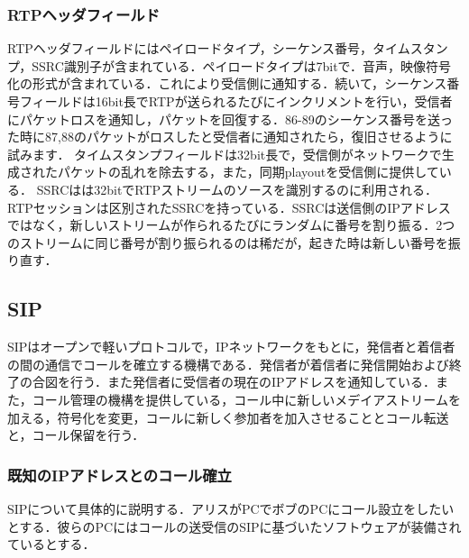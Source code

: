 \documentclass[9pt,a4j,twocolumn]{jsarticle}
\begin{document}
\subsubsection{RTPヘッダフィールド}
RTPヘッダフィールドにはペイロードタイプ，シーケンス番号，タイムスタンプ，SSRC識別子が含まれている．ペイロードタイプは7bitで．音声，映像符号化の形式が含まれている．これにより受信側に通知する．続いて，シーケンス番号フィールドは16bit長でRTPが送られるたびにインクリメントを行い，受信者にパケットロスを通知し，パケットを回復する．86-89のシーケンス番号を送った時に87,88のパケットがロスしたと受信者に通知されたら，復旧させるように試みます．
タイムスタンプフィールドは32bit長で，受信側がネットワークで生成されたパケットの乱れを除去する，また，同期playoutを受信側に提供している．
SSRCはは32bitでRTPストリームのソースを識別するのに利用される．RTPセッションは区別されたSSRCを持っている．SSRCは送信側のIPアドレスではなく，新しいストリームが作られるたびにランダムに番号を割り振る．2つのストリームに同じ番号が割り振られるのは稀だが，起きた時は新しい番号を振り直す．

\subsection{SIP}
SIPはオープンで軽いプロトコルで，IPネットワークをもとに，発信者と着信者の間の通信でコールを確立する機構である．発信者が着信者に発信開始および終了の合図を行う．また発信者に受信者の現在のIPアドレスを通知している．また，コール管理の機構を提供している，コール中に新しいメデイアストリームを加える，符号化を変更，コールに新しく参加者を加入させることとコール転送と，コール保留を行う．

\subsubsection{既知のIPアドレスとのコール確立}
SIPについて具体的に説明する．アリスがPCでボブのPCにコール設立をしたいとする．彼らのPCにはコールの送受信のSIPに基づいたソフトウェアが装備されているとする．
\end{document}
